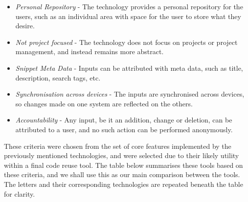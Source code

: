 \begin{itemize}
\item \textit{Personal Repository} - The technology provides a personal repository for the users, such as an individual area with space for the user to store what they desire.
\item \textit{Not project focused} - The technology does not focus on projects or project management, and instead remains more abstract.
\item \textit{Snippet Meta Data} - Inputs can be attributed with meta data, such as title, description, search tags, etc.
\item \textit{Synchronisation across devices} - The inputs are synchronised across devices, so changes made on one system are reflected on the others.
\item \textit{Accountability} - Any input, be it an addition, change or deletion, can be attributed to a user, and no such action can be performed anonymously.
\end{itemize}

These criteria were chosen from the set of core features implemented by the previously mentioned technologies, and were selected due to their likely utility within a final code reuse tool.
The table below summarises these tools based on these criteria, and we shall use this as our main comparison between the tools.
The letters and their corresponding technologies are repeated beneath the table for clarity.


